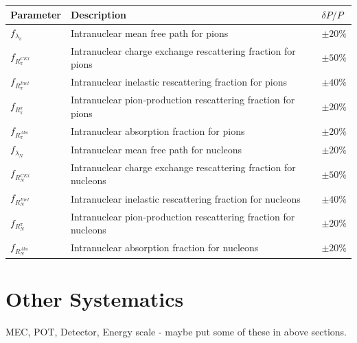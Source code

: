 \begin{table}[!h]
    \renewcommand{\arraystretch}{1.4}
    \begin{tabular}{p{1.8cm} p{11.4cm} p{1.2cm}}
        \toprule
         Parameter & Description & $\delta P / P$ \\
        \midrule
        
         $f_{\lambda_{\pi}}$   & Intranuclear mean free path for pions & $ \pm 20 \% $ \\
        
         $f_{R^{CEx}_{\pi}}$    & Intranuclear charge exchange rescattering fraction for pions & $ \pm 50 \% $ \\
        
         $f_{R^{Inel}_{\pi}}$   & Intranuclear inelastic rescattering fraction for pions & $ \pm 40 \% $ \\
        
         $f_{R^{\pi}_{\pi}}$    & Intranuclear pion-production rescattering fraction for pions & $ \pm 20 \% $ \\
        
         $f_{R^{Abs}_{\pi}}$    & Intranuclear absorption fraction for pions & $ \pm 20 \% $ \\
        
         $f_{\lambda_{N}}$     & Intranuclear mean free path for nucleons & $ \pm 20 \% $ \\
        
         $f_{R^{CEx}_{N}}$      & Intranuclear charge exchange rescattering fraction for nucleons & $ \pm 50 \%$ \\
        
         $f_{R^{Inel}_{N}}$     & Intranuclear inelastic rescattering fraction for nucleons & $ \pm 40 \% $ \\
        
         $f_{R^{\pi}_{N}}$      & Intranuclear pion-production rescattering fraction for nucleons & $ \pm 20 \% $ \\
        
         $f_{R^{Abs}_{N}}$      & Intranuclear absorption fraction for nucleons & $ \pm 20 \% $ \\

        \bottomrule
    \end{tabular}
    \caption[Intranuclear hadron transport systematic parameters]{\cite{GENIE_manual}}
    \label{}
\end{table}


\section{Other Systematics}
MEC, POT, Detector, Energy scale - maybe put some of these in above sections.
